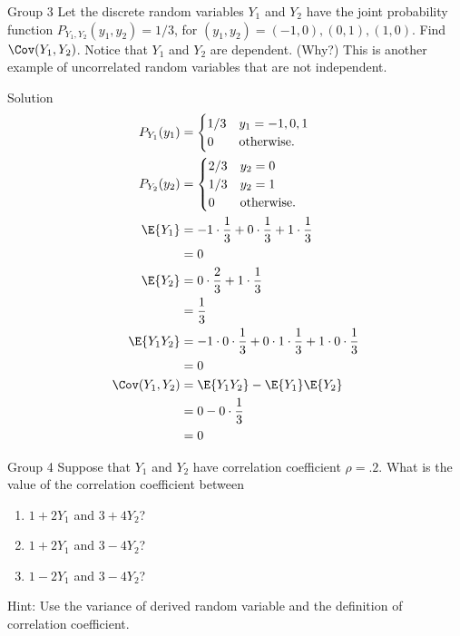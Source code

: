 \documentclass{article}
\theoremstyle{plain}
\theoremstyle{definition}
\theoremstyle{remark}
\begin{document}
\begin{problem}
    {Group 3}
    Let the discrete random variables $Y_1$ and $Y_2$ have the joint probability function $P_{Y_1,Y_2}(y_1, y_2) = 1/3$, for $(y_1, y_2) = (-1, 0), (0, 1), (1, 0)$. Find $\Cov(Y_1, Y_2)$. Notice that $Y_1$ and $Y_2$ are dependent. (Why?) This is another example of uncorrelated random variables that are not independent.
\end{problem}

\begin{solution}
    {Solution}
    \begin{align*}
        P_{Y_1}(y_1) &= {
            \begin{cases}
                1/3 & y_1=-1, 0, 1 \\
                0 & \text{otherwise.}
            \end{cases}
        }\\
        P_{Y_2}(y_2) &= {
            \begin{cases}
                2/3 & y_2=0 \\
                1/3 & y_2=1 \\
                0 & \text{otherwise.}
            \end{cases}
        }\\
        \E{Y_1}
        &= -1\cdot\frac{1}{3}+0\cdot\frac{1}{3}+1\cdot\frac{1}{3} \\
        &= 0 \\
        \E{Y_2}
        &= 0\cdot\frac{2}{3}+1\cdot\frac{1}{3} \\
        &= \frac{1}{3} \\
        \E{Y_1Y_2}
        &= -1\cdot 0\cdot\frac{1}{3}+0\cdot 1\cdot\frac{1}{3}+1\cdot 0\cdot\frac{1}{3} \\
        &= 0 \\
        \Cov(Y_1,Y_2)
        &= \E{Y_1Y_2}-\E{Y_1}\E{Y_2} \\
        &= 0-0\cdot\frac{1}{3} \\
        &= 0
    \end{align*}
\end{solution}

\begin{problem}
    {Group 4}
    Suppose that $Y_1$ and $Y_2$ have correlation coefficient $\rho = .2$. What is the value of the correlation coefficient between
    \begin{enumerate}
        \item $1 + 2Y_1$ and $3 + 4Y_2$?
        \item $1 + 2Y_1$ and $3 - 4Y_2$?
        \item $1 - 2Y_1$ and $3 - 4Y_2$?
    \end{enumerate}
    \begin{solution}
        {Hint:}
        Use the variance of derived random variable and the definition of correlation coefficient.
    \end{solution}
\end{problem}
\end{document}
